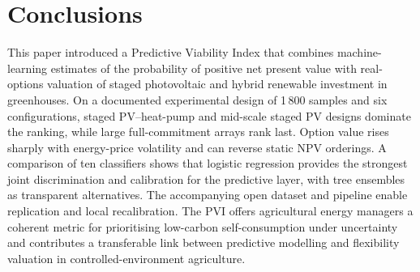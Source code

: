 \documentclass[agriengineering,article,submit,pdftex,moreauthors]{Definitions/mdpi}
\begin{document}
\section{Conclusions}

This paper introduced a Predictive Viability Index that combines machine-learning estimates of the probability of positive net present value with real-options valuation of staged photovoltaic and hybrid renewable investment in greenhouses. On a documented experimental design of 1\,800 samples and six configurations, staged PV--heat-pump and mid-scale staged PV designs dominate the ranking, while large full-commitment arrays rank last. Option value rises sharply with energy-price volatility and can reverse static NPV orderings. A comparison of ten classifiers shows that logistic regression provides the strongest joint discrimination and calibration for the predictive layer, with tree ensembles as transparent alternatives. The accompanying open dataset and pipeline enable replication and local recalibration. The PVI offers agricultural energy managers a coherent metric for prioritising low-carbon self-consumption under uncertainty and contributes a transferable link between predictive modelling and flexibility valuation in controlled-environment agriculture.

\vspace{6pt}






\end{document}
